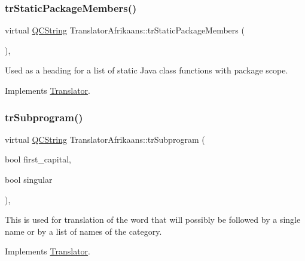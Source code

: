 \mbox{\label{class_translator_afrikaans_a7371d90313be80186cf6254b7090bfad}} 
\subsubsection{\texorpdfstring{trStaticPackageMembers()}{trStaticPackageMembers()}}
{\footnotesize\ttfamily virtual \mbox{\hyperlink{class_q_c_string}{Q\+C\+String}} Translator\+Afrikaans\+::tr\+Static\+Package\+Members (\begin{DoxyParamCaption}{ }\end{DoxyParamCaption})\hspace{0.3cm}{\ttfamily [inline]}, {\ttfamily [virtual]}}

Used as a heading for a list of static Java class functions with package scope. 

Implements \mbox{\hyperlink{class_translator}{Translator}}.

\mbox{\label{class_translator_afrikaans_ada74f7894ea852f2ef89f1b4a957dc9e}} 
\subsubsection{\texorpdfstring{trSubprogram()}{trSubprogram()}}
{\footnotesize\ttfamily virtual \mbox{\hyperlink{class_q_c_string}{Q\+C\+String}} Translator\+Afrikaans\+::tr\+Subprogram (\begin{DoxyParamCaption}\item[{bool}]{first\+\_\+capital,  }\item[{bool}]{singular }\end{DoxyParamCaption})\hspace{0.3cm}{\ttfamily [inline]}, {\ttfamily [virtual]}}

This is used for translation of the word that will possibly be followed by a single name or by a list of names of the category. 

Implements \mbox{\hyperlink{class_translator}{Translator}}.

\mbox{\label{class_translator_afrikaans_a1b1fa1225db0d09114a0d98e2b448dd3}} 
